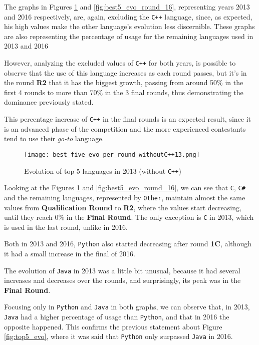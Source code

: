 \documentclass{article}
\begin{document}
\begin{multicols*}{2}
The graphs in Figures \ref{fig:best5_evo_round_13} and \ref{fig:best5_evo_round_16}, representing years 2013 and 2016 respectively, are, again, excluding the \texttt{C++} language, since, as expected, his high values make the other language's evolution less discernible.
These graphs are also representing the percentage of usage for the remaining languages used in 2013 and 2016


However, analyzing the excluded values of \texttt{C++} for both years, is possible to observe that the use of this language increases as each round passes, but it's in the round \textbf{R2} that it has the biggest growth, passing from around 50\% in the first 4 rounds to more than 70\% in the 3 final rounds, thus demonstrating the dominance previously stated.

This percentage increase of \texttt{C++} in the final rounds is an expected result, since it is an advanced phase of the competition and the more experienced contestants tend to use their \textit{go-to} language.


\begin{figure}[H]
    \centering
    \texttt{[image: best\_five\_evo\_per\_round\_withoutC++13.png]}
    \caption{Evolution of top 5 languages in 2013 (without \texttt{C++})}
    \label{fig:best5_evo_round_13}
\end{figure}

Looking at the Figures \ref{fig:best5_evo_round_13} and \ref{fig:best5_evo_round_16}, we can see that \texttt{C}, \texttt{C\#} and the remaining languages, represented by \texttt{Other}, maintain almost the same values from \textbf{Qualification Round} to \textbf{R2}, where the values start decreasing, until they reach 0\% in the \textbf{Final Round}. The only exception is \texttt{C} in 2013, which is used in the last round, unlike in 2016.

Both in 2013 and 2016, \texttt{Python} also started decreasing after round \textbf{1C}, although it had a small increase in the final of 2016.

The evolution of \texttt{Java} in 2013 was a little bit unusual, because it had several increases and decreases over the rounds, and surprisingly, its peak was in the \textbf{Final Round}.

Focusing only in \texttt{Python} and \texttt{Java} in both graphs, we can observe that, in 2013, \texttt{Java} had a higher percentage of usage than \texttt{Python}, and that in 2016 the opposite happened. This confirms the previous statement about Figure \ref{fig:top5_evo}, where it was said that \texttt{Python} only surpassed \texttt{Java} in 2016.


\end{multicols*}
\end{document}
